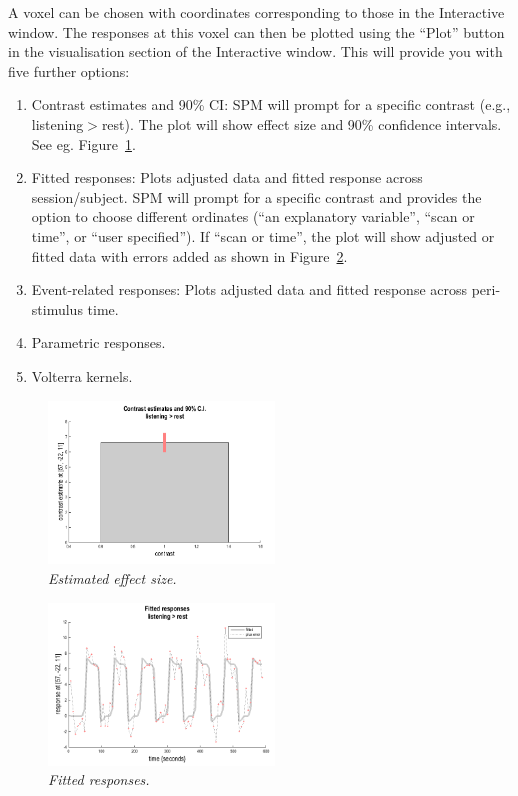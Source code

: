 A voxel can be chosen with coordinates corresponding to those in the Interactive window. The responses at this voxel can then be plotted using the ``Plot'' button in the visualisation section of the Interactive window. This will provide you with five further options:

\begin{enumerate}
\item Contrast estimates and 90\% CI: SPM will prompt for a specific contrast (e.g., listening$>$rest). The plot will show effect size and 90\% confidence intervals. See eg. Figure~\ref{aud_contrast}.
\item Fitted responses: Plots adjusted data and fitted response across session/subject. SPM will prompt for a specific contrast and provides the option to choose different ordinates (``an explanatory variable'', ``scan or time'', or ``user specified''). If ``scan or time'', the plot will show adjusted or fitted data with errors added as shown in Figure~\ref{aud_fitted}.
\item Event-related responses: Plots adjusted data and fitted response across peri-stimulus time.
\item Parametric responses.
\item Volterra kernels.
\end{enumerate}

\begin{figure}
\begin{center}
\includegraphics[width=60mm]{auditory/contrast}
\caption{\em Estimated effect size. \label{aud_contrast}}
\end{center}
\end{figure}

\begin{figure}
\begin{center}
\includegraphics[width=60mm]{auditory/fitted}
\caption{\em Fitted responses. \label{aud_fitted}}
\end{center}
\end{figure}

